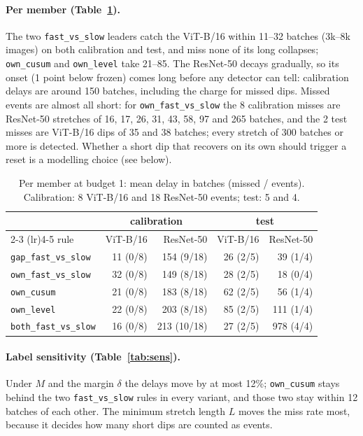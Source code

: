 \documentclass[10pt]{article}
\newcommand{\rl}[1]{\texttt{#1}}
\newcommand{\vit}{ViT-B/16}
\newcommand{\rn}{ResNet-50}
\begin{document}
\paragraph{Per member (Table~\ref{tab:mem}).} The two \rl{fast\_vs\_slow} leaders catch the \vit{} within 11--32 batches (3k--8k images) on both calibration and test, and miss none of its long collapses; \rl{own\_cusum} and \rl{own\_level} take 21--85. The \rn{} decays gradually, so its onset (1 point below frozen) comes long before any detector can tell: calibration delays are around 150 batches, including the charge for missed dips.
Missed events are almost all short: for \rl{own\_fast\_vs\_slow} the 8 calibration misses are \rn{} stretches of 16, 17, 26, 31, 43, 58, 97 and 265 batches, and the 2 test misses are \vit{} dips of 35 and 38 batches; every stretch of 300 batches or more is detected. Whether a short dip that recovers on its own should trigger a reset is a modelling choice (see below).

\begin{table}[ht]
  \centering\small
  \caption{Per member at budget 1: mean delay in batches (missed / events). Calibration: 8 \vit{} and 18 \rn{} events; test: 5 and 4.}
  \label{tab:mem}
  \begin{tabular}{lrrrr}
    \toprule
    & \multicolumn{2}{c}{calibration} & \multicolumn{2}{c}{test} \\
    \cmidrule(lr){2-3} \cmidrule(lr){4-5}
    rule & \vit{} & \rn{} & \vit{} & \rn{} \\
    \midrule
    \rl{gap\_fast\_vs\_slow} & 11 (0/8) & 154 (9/18) & 26 (2/5) & 39 (1/4) \\
    \rl{own\_fast\_vs\_slow} & 32 (0/8) & 149 (8/18) & 28 (2/5) & 18 (0/4) \\
    \rl{own\_cusum} & 21 (0/8) & 183 (8/18) & 62 (2/5) & 56 (1/4) \\
    \rl{own\_level} & 22 (0/8) & 203 (8/18) & 85 (2/5) & 111 (1/4) \\
    \rl{both\_fast\_vs\_slow} & 16 (0/8) & 213 (10/18) & 27 (2/5) & 978 (4/4) \\
    \bottomrule
  \end{tabular}
\end{table}

\paragraph{Label sensitivity (Table~\ref{tab:sens}).} Under $M$ and the margin $\delta$ the delays move by at most 12\%; \rl{own\_cusum} stays behind the two \rl{fast\_vs\_slow} rules in every variant, and those two stay within 12 batches of each other. The minimum stretch length $L$ moves the miss rate most, because it decides how many short dips are counted as events.
\end{document}
